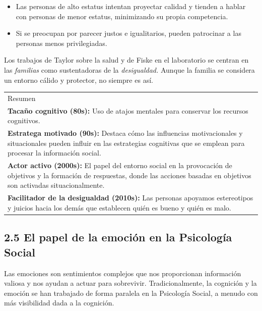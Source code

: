 \documentclass[
]{website}
\begin{document}
\begin{itemize}
\item
  Las personas de alto estatus intentan proyectar calidad y tienden a hablar con personas de menor estatus, minimizando su propia competencia.
\item
  Si se preocupan por parecer justos e igualitarios, pueden patrocinar a las personas menos privilegiadas.
\end{itemize}

Los trabajos de Taylor sobre la salud y de Fiske en el laboratorio se centran en las \emph{familias} como sustentadoras de la \emph{desigualdad.} Aunque la familia se considera un entorno cálido y protector, no siempre es así.

\begin{longtable}[]{@{}
  >{\raggedright\arraybackslash}p{}@{}}
\toprule\noalign{}
\endhead
\bottomrule\noalign{}
\endlastfoot
Resumen \\
* \textbf{Tacaño cognitivo (80s):} Uso de atajos mentales para conservar los recursos cognitivos. \\
* \textbf{Estratega motivado (90s):} Destaca cómo las influencias motivacionales y situacionales pueden influir en las estrategias cognitivas que se emplean para procesar la información social. \\
* \textbf{Actor activo (2000s):} El papel del entorno social en la provocación de objetivos y la formación de respuestas, donde las acciones basadas en objetivos son activadas situacionalmente. \\
* \textbf{Facilitador de la desigualdad (2010s):} Las personas apoyamos estereotipos y juicios hacia los demás que establecen quién es bueno y quién es malo. \\
\end{longtable}

\subsection*{2.5 El papel de la emoción en la Psicología Social}\label{subtema2_5}

Las emociones son sentimientos complejos que nos proporcionan información valiosa y nos ayudan a actuar para sobrevivir. Tradicionalmente, la cognición y la emoción se han trabajado de forma paralela en la Psicología Social, a menudo con más visibilidad dada a la cognición.
\end{document}
